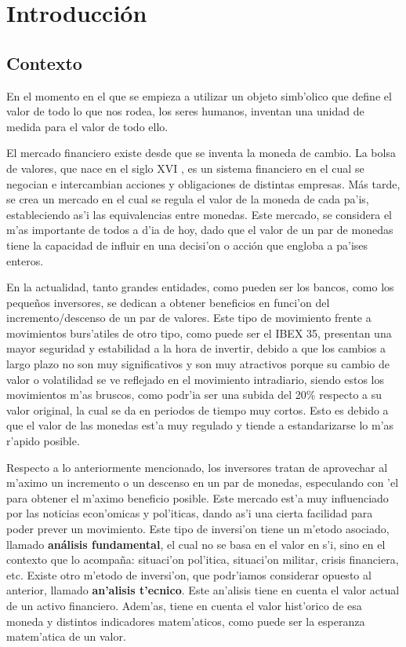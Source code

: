 
\chapter{Introducci\'on}\label{cap1}
\section{Contexto}\label{sec:contexto}


En el momento en el que se empieza a utilizar un objeto simb'olico que define el valor de todo lo que nos rodea, los seres humanos, inventan una unidad de medida para el valor de todo ello.

El mercado financiero existe desde que se inventa la moneda de cambio. 
La bolsa de valores, que nace en el siglo XVI \cite{introduccion1}, es un sistema financiero en el cual se negocian e intercambian acciones y obligaciones de distintas empresas. Más tarde, se crea un mercado en el cual se regula el valor de la moneda de cada pa'is, estableciendo as'i las equivalencias entre monedas. Este mercado, se considera el m'as importante de todos a d'ia de hoy, dado que el valor de un par de monedas tiene la capacidad de influir en una decisi'on o acción que engloba a pa'ises enteros.


En la actualidad, tanto grandes entidades, como pueden ser los bancos, como los pequeños inversores, se dedican a obtener beneficios en funci'on del incremento/descenso de un par de valores. Este tipo de movimiento frente a movimientos burs'atiles de otro tipo, como puede ser el IBEX 35, presentan una mayor seguridad y estabilidad a la hora de invertir, debido a que los cambios a largo plazo no son muy significativos y son muy atractivos porque su cambio de valor o volatilidad se ve reflejado en el movimiento intradiario, siendo estos los movimientos m'as bruscos, como podr'ia ser una subida del 20\% respecto a su valor original, la cual se da en periodos de tiempo muy cortos. Esto es debido a que el valor de las monedas est'a muy regulado y tiende a estandarizarse lo m'as r'apido posible.

Respecto a lo anteriormente mencionado, los inversores tratan de aprovechar al m'aximo un incremento o un descenso en un par de monedas, especulando con 'el para obtener el m'aximo beneficio posible. Este mercado est'a muy influenciado por las noticias econ'omicas y pol'iticas, dando as'i una cierta facilidad para poder prever un movimiento. Este tipo de inversi'on tiene un m'etodo asociado, llamado \textbf{análisis fundamental}, el cual no se basa en el valor en s'i, sino en el contexto que lo acompaña: situaci'on pol'itica, situaci'on militar, crisis financiera, etc.
Existe otro m'etodo de inversi'on, que podr'iamos considerar opuesto al anterior, llamado \textbf{an'alisis t'ecnico}. Este an'alisis tiene en cuenta el valor actual de un activo financiero. Adem'as, tiene en cuenta el valor hist'orico de esa moneda y distintos indicadores matem'aticos, como puede ser la esperanza matem'atica de un valor.

